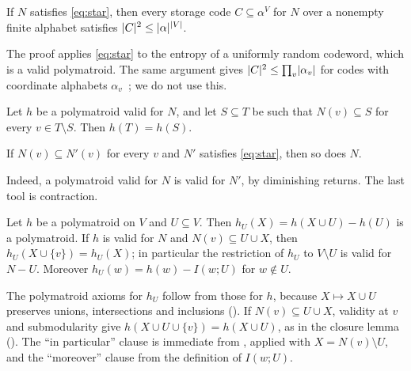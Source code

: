 \begin{theorem}\label{thm:codes}
If $N$ satisfies \eqref{eq:star}, then every storage code $C\subseteq\alpha^V$ for $N$ over a nonempty finite
alphabet satisfies $\lvert C \rvert^2\le\lvert \alpha \rvert^{\lvert V \rvert}$.
\end{theorem}

The proof applies \eqref{eq:star} to the entropy of a uniformly random codeword, which is a valid
polymatroid. The same argument gives $\lvert C \rvert^2\le\prod_v\lvert \alpha_v \rvert$ for codes with coordinate alphabets
$\alpha_v$~\cite[Corollary~3.4]{CircularMemo2026}; we do not use this.

\begin{lemma}[Closure]\label{lem:closure}
Let $h$ be a polymatroid valid for $N$, and let $S\subseteq T$ be such that $N(v)\subseteq S$ for every
$v\in T\setminus S$. Then $h(T)=h(S)$.
\end{lemma}

\begin{lemma}\label{lem:fewer-arcs}
If $N(v)\subseteq N'(v)$ for every $v$ and $N'$ satisfies \eqref{eq:star}, then so does $N$.
\end{lemma}

Indeed, a polymatroid valid for $N$ is valid for $N'$, by diminishing returns. The last tool is contraction.

\begin{lemma}[Contraction]\label{lem:contraction}
Let $h$ be a polymatroid on $V$ and $U\subseteq V$. Then $h_U(X)=h(X\cup U)-h(U)$ is a polymatroid. If $h$ is valid
for $N$ and $N(v)\subseteq U\cup X$, then $h_U(X\cup\{v\})=h_U(X)$; in particular the restriction of $h_U$ to
$V\setminus U$ is valid for $N-U$. Moreover $h_U(w)=h(w)-I(w;U)$ for $w\notin U$.
\end{lemma}

\begin{outline}
The polymatroid axioms for $h_U$ follow from those for $h$, because $X\mapsto X\cup U$ preserves unions,
intersections and inclusions (). If $N(v)\subseteq U\cup X$, validity at $v$ and
submodularity give $h(X\cup U\cup\{v\})=h(X\cup U)$, as in the closure lemma (). The ``in
particular'' clause is immediate from , applied with $X=N(v)\setminus U$, and the ``moreover''
clause from the definition of $I(w;U)$.
\end{outline}

